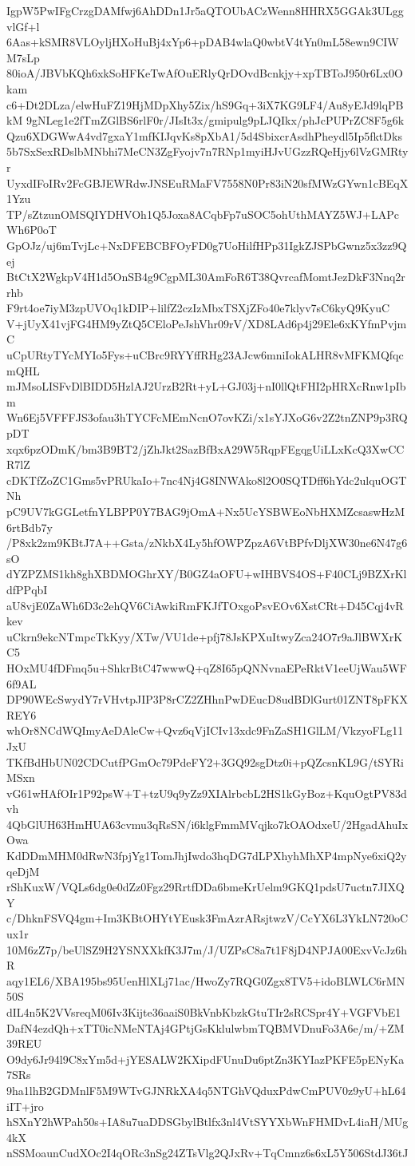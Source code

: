 IgpW5PwIFgCrzgDAMfwj6AhDDn1Jr5aQTOUbACzWenn8HHRX5GGAk3ULggvlGf+l
6Aas+kSMR8VLOyljHXoHuBj4xYp6+pDAB4wlaQ0wbtV4tYn0mL58ewn9CIWM7sLp
80ioA/JBVbKQh6xkSoHFKeTwAfOuERlyQrDOvdBcnkjy+xpTBToJ950r6Lx0Okam
c6+Dt2DLza/elwHuFZ19HjMDpXhy5Zix/hS9Gq+3iX7KG9LF4/Au8yEJd9lqPBkM
9gNLeg1e2fTmZGlBS6rlF0r/JIsIt3x/gmipulg9pLJQIkx/phJcPUPrZC8F5g6k
Qzu6XDGWwA4vd7gxaY1mfKIJqvKs8pXbA1/5d4SbixcrAsdhPheydl5Ip5fktDks
5b7SxSexRDslbMNbhi7MeCN3ZgFyojv7n7RNp1myiHJvUGzzRQeHjy6lVzGMRtyr
UyxdIFoIRv2FcGBJEWRdwJNSEuRMaFV7558N0Pr83iN20sfMWzGYwn1cBEqX1Yzu
TP/sZtzunOMSQIYDHVOh1Q5Joxa8ACqbFp7uSOC5ohUthMAYZ5WJ+LAPcWh6P0oT
GpOJz/uj6mTvjLc+NxDFEBCBFOyFD0g7UoHilfHPp31IgkZJSPbGwnz5x3zz9Qej
BtCtX2WgkpV4H1d5OnSB4g9CgpML30AmFoR6T38QvrcafMomtJezDkF3Nnq2rrhb
F9rt4oe7iyM3zpUVOq1kDIP+lilfZ2czIzMbxTSXjZFo40e7klyv7sC6kyQ9KyuC
V+jUyX41vjFG4HM9yZtQ5CEloPeJshVhr09rV/XD8LAd6p4j29Ele6xKYfmPvjmC
uCpURtyTYcMYIo5Fys+uCBrc9RYYffRHg23AJcw6mniIokALHR8vMFKMQfqcmQHL
mJMsoLISFvDlBIDD5HzlAJ2UrzB2Rt+yL+GJ03j+nI0llQtFHI2pHRXcRnw1pIbm
Wn6Ej5VFFFJS3ofau3hTYCFcMEmNcnO7ovKZi/x1sYJXoG6v2Z2tnZNP9p3RQpDT
xqx6pzODmK/bm3B9BT2/jZhJkt2SazBfBxA29W5RqpFEgqgUiLLxKcQ3XwCCR7lZ
cDKTfZoZC1Gms5vPRUkaIo+7nc4Nj4G8INWAko8l2O0SQTDff6hYdc2ulquOGTNh
pC9UV7kGGLetfnYLBPP0Y7BAG9jOmA+Nx5UcYSBWEoNbHXMZcsaswHzM6rtBdb7y
/P8xk2zm9KBtJ7A++Gsta/zNkbX4Ly5hfOWPZpzA6VtBPfvDljXW30ne6N47g6sO
dYZPZMS1kh8ghXBDMOGhrXY/B0GZ4aOFU+wIHBVS4OS+F40CLj9BZXrKldfPPqbI
aU8vjE0ZaWh6D3c2ehQV6CiAwkiRmFKJfTOxgoPsvEOv6XstCRt+D45Cqj4vRkev
uCkrn9ekcNTmpcTkKyy/XTw/VU1de+pfj78JsKPXuItwyZca24O7r9aJlBWXrKC5
HOxMU4fDFmq5u+ShkrBtC47wwwQ+qZ8I65pQNNvnaEPeRktV1eeUjWau5WF6f9AL
DP90WEcSwydY7rVHvtpJIP3P8rCZ2ZHhnPwDEucD8udBDlGurt01ZNT8pFKXREY6
whOr8NCdWQImyAeDAleCw+Qvz6qVjICIv13xdc9FnZaSH1GlLM/VkzyoFLg11JxU
TKfBdHbUN02CDCutfPGmOc79PdeFY2+3GQ92sgDtz0i+pQZcsnKL9G/tSYRiMSxn
vG61wHAfOIr1P92psW+T+tzU9q9yZz9XIAlrbcbL2HS1kGyBoz+KquOgtPV83dvh
4QbGlUH63HmHUA63cvmu3qRsSN/i6klgFmmMVqjko7kOAOdxeU/2HgadAhuIxOwa
KdDDmMHM0dRwN3fpjYg1TomJhjIwdo3hqDG7dLPXhyhMhXP4mpNye6xiQ2yqeDjM
rShKuxW/VQLs6dg0e0dZz0Fgz29RrtfDDa6bmeKrUelm9GKQ1pdsU7uctn7JIXQY
c/DhknFSVQ4gm+Im3KBtOHYtYEusk3FmAzrARsjtwzV/CcYX6L3YkLN720oCux1r
10M6zZ7p/beUlSZ9H2YSNXXkfK3J7m/J/UZPsC8a7t1F8jD4NPJA00ExvVcJz6hR
aqy1EL6/XBA195bs95UenHlXLj71ac/HwoZy7RQG0Zgx8TV5+idoBLWLC6rMN50S
dIL4n5K2VVsreqM06Iv3Kijte36aaiS0BkVnbKbzkGtuTIr2sRCSpr4Y+VGFVbE1
DafN4ezdQh+xTT0icNMeNTAj4GPtjGsKklulwbmTQBMVDnuFo3A6e/m/+ZM39REU
O9dy6Jr94l9C8xYm5d+jYESALW2KXipdFUnuDu6ptZn3KYIazPKFE5pENyKa7SRs
9ha1lhB2GDMnlF5M9WTvGJNRkXA4q5NTGhVQduxPdwCmPUV0z9yU+hL64iIT+jro
hSXnY2hWPah50s+IA8u7uaDDSGbylBtlfx3nl4VtSYYXbWnFHMDvL4iaH/MUg4kX
nSSMoaunCudXOc2I4qORc3nSg24ZTsVlg2QJxRv+TqCmnz6s6xL5Y506StdJ36tJ
